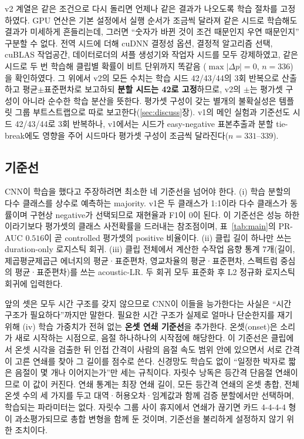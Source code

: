 \documentclass[10pt,twocolumn]{article}
\renewcommand{\emph}[1]{\textbf{#1}}
\begin{document}
v2 계열은 같은 조건으로 다시 돌리면 언제나 같은 결과가 나오도록 학습 절차를 고정하였다.
GPU 연산은 기본 설정에서 실행 순서가 조금씩 달라져 같은 시드로 학습해도 결과가 미세하게
흔들리는데, 그러면 ``숫자가 바뀐 것이 조건 때문인지 우연 때문인지'' 구분할 수 없다. 전역 시드에
더해 cuDNN 결정성 옵션, 결정적 알고리즘 선택, cuBLAS 작업공간, 데이터로더의 셔플 생성기와 작업자
시드를 모두 강제하였고, 같은 시드로 두 번 학습해 클립별 확률이 비트 단위까지 똑같음
($\max|\Delta p|=0$, $n=336$)을 확인하였다. 그 위에서 v2의 모든 수치는 학습 시드 42/43/44의
3회 반복으로 산출하고 평균$\pm$표준편차로 보고하되 \emph{분할 시드는 42로 고정}하므로, v2의
$\pm$는 평가셋 구성이 아니라 순수한 학습 분산을 뜻한다. 평가셋 구성이 갖는 별개의 불확실성은
템플릿 그룹 부트스트랩으로 따로 보고한다(\ref{sec:discuss}장). v1의 메인 실험과 기준선도 시드
42/43/44로 3회 반복하나, v1에서는 시드가 easy-negative 표본추출과 분할 tie-break에도 영향을
주어 시드마다 평가셋 구성이 조금씩 달라진다($n=331$--$339$).

\subsection{기준선}
CNN이 학습을 했다고 주장하려면 최소한 네 기준선을 넘어야 한다. (i) 학습 분할의 다수 클래스를
상수로 예측하는 majority. v1은 두 클래스가 1:1이라 다수 클래스가 동률이며 구현상 negative가
선택되므로 재현율과 F1이 0이 된다. 이 기준선은 성능 하한이라기보다 평가셋의 클래스
사전확률을 드러내는 참조점이며, 표~\ref{tab:main}의 PR-AUC $0.516$이 곧 controlled 평가셋의
positive 비율이다. (ii) 클립 길이 하나만 쓰는 duration-only 로지스틱 회귀. (iii) 클립 전체에서
계산한 수작업 음향 통계 7개(길이, 제곱평균제곱근 에너지의 평균·표준편차, 영교차율의
평균·표준편차, 스펙트럼 중심의 평균·표준편차)를 쓰는 acoustic-LR. 두 회귀 모두 표준화 후 L2
정규화 로지스틱 회귀에 입력한다.

앞의 셋은 모두 시간 구조를 갖지 않으므로 CNN이 이들을 능가한다는 사실은 ``시간 구조가
필요하다''까지만 말한다. 필요한 시간 구조가 실제로 얼마나 단순한지를 재기 위해 (iv) 학습
가중치가 전혀 없는 \emph{온셋 연쇄 기준선}을 추가한다. 온셋(onset)은 소리가 새로 시작하는
시점으로, 음절 하나하나의 시작점에 해당한다. 이 기준선은 클립에서 온셋 시각을 검출한 뒤
인접 간격이 사람의 음절 속도 범위 안에 있으면서 서로 간격이 고른 연쇄를 찾아 그 길이를 점수로
쓴다. 신경망도 학습도 없이 ``일정한 박자로 짧은 음절이 몇 개나 이어지는가''만 세는 규칙이다. 자릿수 낭독은 등간격 단음절 연쇄이므로 이 값이 커진다. 연쇄 통계는 최장 연쇄 길이, 모든
등간격 연쇄의 온셋 총합, 전체 온셋 수의 세 가지를 두고 대역·허용오차·임계값과 함께 검증
분할에서만 선택하며, 학습되는 파라미터는 없다. 자릿수 그룹 사이 휴지에서 연쇄가 끊기면 카드
4-4-4-4 형이 과소평가되므로 총합 변형을 함께 둔 것이며, 기준선을 불리하게 설정하지 않기 위한
조치이다.
\end{document}

